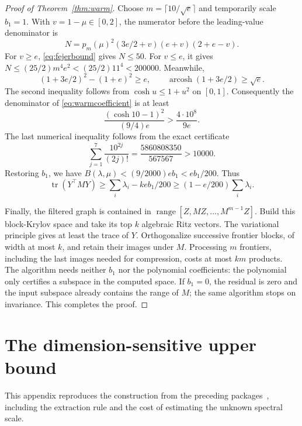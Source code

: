 \documentclass[11pt]{article}
\numberwithin{equation}{section}
\theoremstyle{remark}\newtheorem{remark}[theorem]{Remark}
\newcommand{\tr}{\operatorname{tr}}
\newcommand{\range}{\operatorname{range}}
\begin{document}
\begin{proof}[Proof of Theorem~\ref{thm:warm}]
Choose $m=\lceil10/\sqrt e\rceil$ and temporarily scale $b_1=1$. With $v=1-\mu\in[0,2]$, the numerator before the leading-value denominator is
\[
N=p_m(\mu)^2(3e/2+v)(e+v)(2+e-v).
\]
For $v\ge e$, \eqref{eq:fejerbound} gives $N\le50$. For $v\le e$, it gives $N\le(25/2)m^4e^2<(25/2)11^4<200000$. Meanwhile,
\[
(1+3e/2)^2-(1+e)^2\ge e,\qquad
\operatorname{arcosh}(1+3e/2)\ge\sqrt e.
\]
The second inequality follows from $\cosh u\le1+u^2$ on $[0,1]$. Consequently the denominator of \eqref{eq:warmcoefficient} is at least
\[
\frac{(\cosh10-1)^2}{(9/4)e}>\frac{4\cdot10^8}{9e}.
\]
The last numerical inequality follows from the exact certificate
\[
\sum_{j=1}^7 \frac{10^{2j}}{(2j)!}=\frac{5860808350}{567567}>10000.
\]
Restoring $b_1$, we have $B(\lambda,\mu)<(9/2000)eb_1<eb_1/200$. Thus
\[
\tr(Y^\top MY)\ge\sum_i\lambda_i-keb_1/200
\ge(1-e/200)\sum_i\lambda_i.
\]

Finally, the filtered graph is contained in
$\range[Z,MZ,\ldots,M^{m-1}Z]$. Build this block-Krylov space and take its top $k$ algebraic Ritz vectors. The variational principle gives at least the trace of $Y$. Orthogonalize successive frontier blocks, of width at most $k$, and retain their images under $M$. Processing $m$ frontiers, including the last images needed for compression, costs at most $km$ products. The algorithm needs neither $b_1$ nor the polynomial coefficients: the polynomial only certifies a subspace in the computed space. If $b_1=0$, the residual is zero and the input subspace already contains the range of $M$; the same algorithm stops on invariance. This completes the proof.
\end{proof}

\section{The dimension-sensitive upper bound}\label{app:upper}
This appendix reproduces the construction from the preceding packages~\cite{prior3,prior4}, including the extraction rule and the cost of estimating the unknown spectral scale.
\end{document}
